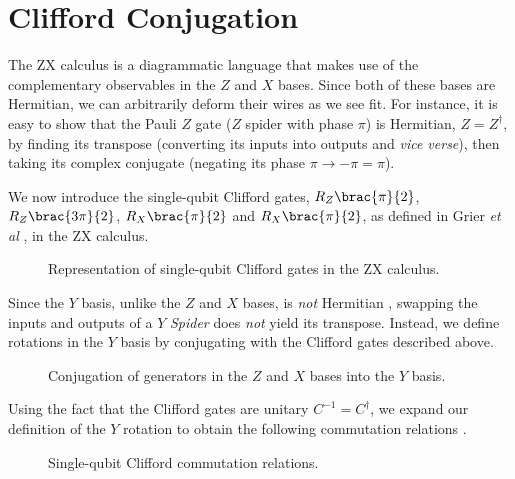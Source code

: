 \section{Clifford Conjugation}%
\label{clifford-conjugation}

The ZX calculus is a diagrammatic language that makes use of the complementary observables in the $Z$ and $X$ bases. Since both of these bases are Hermitian, we can arbitrarily deform their wires as we see fit. For instance, it is easy to show that the Pauli $Z$ gate ($Z$ spider with phase $\pi$) is Hermitian, $Z = Z^\dagger$, by finding its transpose (converting its inputs into outputs and \textit{vice verse}), then taking its complex conjugate (negating its phase $\pi \rightarrow -\pi = \pi$).


We now introduce the single-qubit Clifford gates, $R_Z \brac{\pi}{2}$, $R_Z \brac{3\pi}{2}$, $R_X \brac{\pi}{2}$ and $R_X \brac{\pi}{2}$, as defined in Grier \textit{et al} \cite{Grier2016}, in the ZX calculus.

\begin{figure}[H]
    \centering
    \caption{Representation of single-qubit Clifford gates in the ZX calculus.}
    \label{clifford-definitions}
\end{figure}


Since the $Y$ basis, unlike the $Z$ and $X$ bases, is \textit{not} Hermitian \cite{Yeung2020}, swapping the inputs and outputs of a $Y$ \textit{Spider} does \textit{not} yield its transpose. Instead, we define rotations in the $Y$ basis by conjugating with the Clifford gates described above.

\begin{figure}[H]
    \centering
    \caption{Conjugation of generators in the $Z$ and $X$ bases into the $Y$ basis.}
    \label{pauli-Y}
\end{figure}

Using the fact that the Clifford gates are unitary $C^{-1} = C^\dagger$, we expand our definition of the $Y$ rotation to obtain the following commutation relations \cite{Yeung2020}.


\begin{figure}[H]
    \centering
    \caption{Single-qubit Clifford commutation relations.}
    \label{clifford-commutation}
\end{figure}


